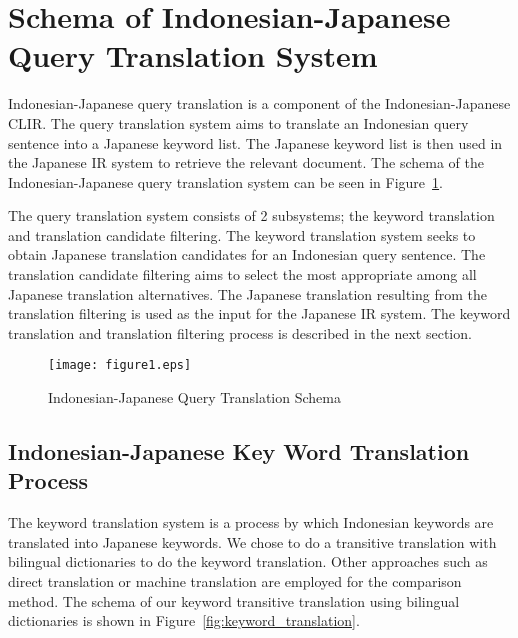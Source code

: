 \documentclass[english]{jnlp_1.3c}
\begin{document}
\section{Schema of Indonesian-Japanese Query Translation System}
\label{Schema of Indonesian - Japanese Query Translation System}

Indonesian-Japanese query translation is a component of the
Indonesian-Japanese CLIR. The query translation system aims to translate
an Indonesian query sentence into a Japanese keyword list. The Japanese
keyword list is then used in the Japanese IR system to retrieve the
relevant document. The schema of the Indonesian-Japanese query
translation system can be seen in Figure~\ref{fig:query_translation}.

The query translation system consists of 2 subsystems; the keyword
translation and translation candidate filtering. The keyword translation
system seeks to obtain Japanese translation candidates for an Indonesian
query sentence. The translation candidate filtering aims to select the
most appropriate among all Japanese translation alternatives. The
Japanese translation resulting from the translation filtering is used as
the input for the Japanese IR system. The keyword translation and
translation filtering process is described in the next section.

\begin{figure}[b]
  \begin{center}
    \texttt{[image: figure1.eps]}
  \end{center}
  \caption{Indonesian-Japanese Query Translation Schema}
  \label{fig:query_translation}
\end{figure}



\subsection{Indonesian-Japanese Key Word Translation Process}

The keyword translation system is a process by which Indonesian keywords
are translated into Japanese keywords. We chose to do a transitive
translation with bilingual dictionaries to do the keyword
translation. Other approaches such as direct translation or machine
translation are employed for the comparison method. The schema of our
keyword transitive translation using bilingual dictionaries is shown in
Figure~\ref{fig:keyword_translation}.  
\end{document}

